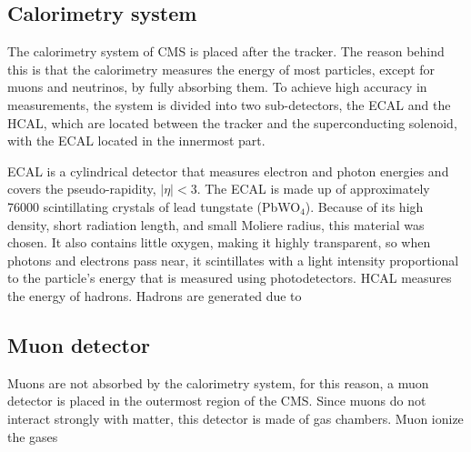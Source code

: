 \subsection{Calorimetry system}
The calorimetry system of CMS is placed after the tracker. The reason behind this is that the calorimetry measures the energy of most particles, except for muons and neutrinos, by fully absorbing them. To achieve high accuracy in measurements, the system is divided into two sub-detectors, the ECAL and the HCAL, which are located between the tracker and the superconducting solenoid, with the ECAL located in the innermost part.

ECAL is a cylindrical detector that measures electron and photon energies and covers the pseudo-rapidity, $|\eta| < 3$. The ECAL is made up of approximately 76000 scintillating crystals of lead tungstate (PbWO$_4$). Because of its high density, short radiation length, and small Moliere radius, this material was chosen. It also contains little oxygen, making it highly transparent, so when photons and electrons pass near, it scintillates with a light intensity proportional to the particle's energy that is measured using photodetectors.
HCAL measures the energy of hadrons. Hadrons are generated due to 
\subsection{Muon detector}
Muons are not absorbed by the calorimetry system, for this reason, a muon detector is placed in the outermost region of the CMS. Since muons do not interact strongly with matter, this detector is made of gas chambers. Muon ionize the gases 